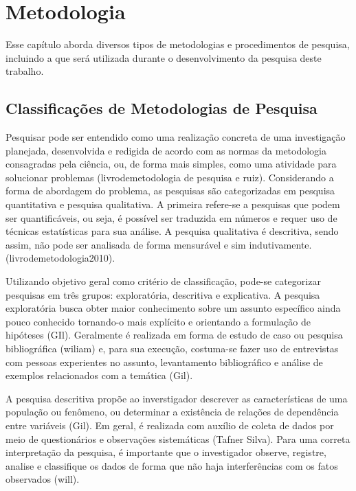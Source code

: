 \chapter[Metodologia]{Metodologia}

Esse capítulo aborda diversos tipos de metodologias e procedimentos de pesquisa, incluindo a que será utilizada durante o desenvolvimento da pesquisa deste trabalho. 

 \section{Classificações de Metodologias de Pesquisa}
  
Pesquisar pode ser entendido como uma realização concreta de uma investigação planejada, desenvolvida e redigida de acordo com as normas da metodologia consagradas pela ciência, ou, de forma mais simples, como uma atividade para solucionar problemas (livrodemetodologia de pesquisa e ruiz). Considerando a forma de abordagem do problema, as pesquisas são categorizadas em pesquisa quantitativa e pesquisa qualitativa. A primeira refere-se a pesquisas que podem ser quantificáveis, ou seja, é possível ser traduzida em números e requer uso de técnicas estatísticas para sua análise. A pesquisa qualitativa é descritiva, sendo assim, não pode ser analisada de forma mensurável e sim indutivamente.(livrodemetodologia2010).

 \par
  \indent Utilizando objetivo geral como critério de classificação, pode-se categorizar pesquisas em três grupos: exploratória, descritiva e explicativa. A pesquisa exploratória busca obter maior conhecimento sobre um assunto específico ainda pouco conhecido tornando-o mais explícito e orientando a formulação de hipóteses (GIl). Geralmente é realizada em forma de estudo de caso ou pesquisa bibliográfica (wiliam) e, para sua execução, costuma-se fazer uso de entrevistas com pessoas experientes no assunto, levantamento bibliográfico e análise de exemplos relacionados com a temática (Gil). 

 \par
  \indent A pesquisa descritiva propõe ao inverstigador descrever as características de uma população ou fenômeno, ou determinar a existência de relações de dependência entre variáveis (Gil).  Em geral, é realizada com auxílio de coleta de dados por meio de questionários e observações sistemáticas (Tafner Silva). Para uma correta interpretação da pesquisa, é importante que o investigador observe, registre, analise e classifique os dados de forma que não haja interferências com os fatos observados (will). 

